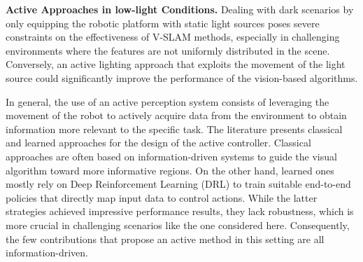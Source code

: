 

\textbf{Active Approaches in low-light Conditions.}
Dealing with dark scenarios by only equipping the robotic platform with static light sources poses severe constraints on the effectiveness of V-SLAM methods, especially in challenging environments where the features are not uniformly distributed in the scene. Conversely, an active lighting approach that exploits the movement of the light source could significantly improve the performance of the vision-based algorithms. %

In general, the use of an active perception system \cite{bajcsy1988active} consists of leveraging the movement of the robot to actively acquire data from the environment to obtain information more relevant to the specific task. 
The literature presents classical and learned approaches for the design of the active controller. Classical approaches are often based on information-driven systems \cite{eidenberger2010active, stampfer2012information} to guide the visual algorithm toward more informative regions. On the other hand, learned ones mostly rely on Deep Reinforcement Learning (DRL) \cite{dionigi2022vat,dionigi2024d} to train suitable end-to-end policies that directly map input data to control actions. While the latter strategies achieved impressive performance results, they lack robustness, which is more crucial in challenging scenarios like the one considered here. Consequently, the few contributions that propose an active method in this setting are all information-driven.


